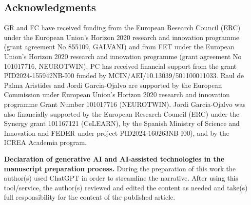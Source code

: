 \documentclass[11pt]{article}
\numberwithin{equation}{section}
\begin{document}

 \subsection*{Acknowledgments}
GR and FC have received funding from the European Research Council (ERC) under the European Union’s Horizon 2020 research and innovation programme (grant agreement No 855109, GALVANI) and from FET under the European Union’s Horizon 2020 research and innovation programme (grant agreement No 101017716, NEUROTWIN). 
PC has received financial support from the grant PID2024-155942NB-I00 funded by MCIN/AEI/10.13039/501100011033.
Raul de Palma Aristides and Jordi Garcia-Ojalvo are supported by the European Commission under European Union’s Horizon 2020 research and innovation programme Grant Number 101017716 (NEUROTWIN). Jordi Garcia-Ojalvo was also financially supported by the European Research Council (ERC) under the Synergy grant 101167121 (CeLEARN), by the Spanish Ministry of Science and Innovation and FEDER under project PID2024-160263NB-I00), and by the ICREA Academia program.

\textbf{Declaration of generative AI and AI-assisted technologies in the manuscript preparation process.}
During the preparation of this work the author(s) used ChatGPT in order to streamline the narrative. After using this tool/service, the author(s) reviewed and edited the content as needed and take(s) full responsibility for the content of the published article.



\clearpage


\end{document}
